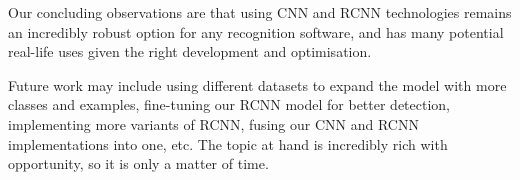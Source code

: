 \documentclass[12pt, landscape]{article}
\begin{document}
\begin{multicols}{3}
Our concluding observations are that using CNN and RCNN technologies remains an
incredibly robust option for any recognition software, and has many potential
real-life uses given the right development and optimisation.

Future work may include using different datasets to expand the model with more
classes and examples, fine-tuning our RCNN model for better detection,
implementing more variants of RCNN, fusing our CNN and RCNN implementations into
one, etc. The topic at hand is incredibly rich with opportunity, so it is only a
matter of time.


\end{multicols}
\end{document}
